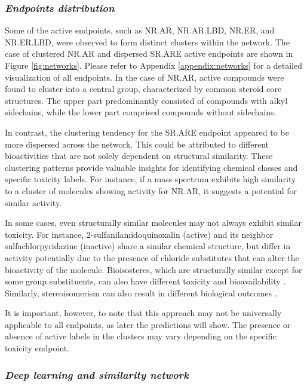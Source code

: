 \subsubsection*{\textit{Endpoints distribution}}

Some of the active endpoints, such as NR.AR, NR.AR.LBD, NR.ER, and NR.ER.LBD, were observed to form distinct clusters within the network. The case of clustered NR.AR and dispersed SR.ARE active endpoints are shown in Figure \ref{fig:networks}. Please refer to Appendix \ref{appendix:networks} for a detailed visualization of all endpoints. In the case of NR.AR, active compounds were found to cluster into a central group, characterized by common steroid core structures. The upper part predominantly consisted of compounds with alkyl sidechains, while the lower part comprised compounds without sidechains.

In contrast, the clustering tendency for the SR.ARE endpoint appeared to be more dispersed across the network. This could be attributed to different bioactivities that are not solely dependent on structural similarity. These clustering patterns provide valuable insights for identifying chemical classes and specific toxicity labels. For instance, if a mass spectrum exhibits high similarity to a cluster of molecules showing activity for NR.AR, it suggests a potential for similar activity.

In some cases, even structurally similar molecules may not always exhibit similar toxicity. For instance, 2-sulfanilamidoquinoxalin (active) and its neighbor sulfachlorpyridazine (inactive) share a similar chemical structure, but differ in activity potentially due to the presence of chloride substitutes that can alter the bioactivity of the molecule. Bioisosteres, which are structurally similar except for some group substituents, can also have different toxicity and bioavailability \cite{Meanwell2014}\cite{Svirev2022}. Similarly, stereoisomerism can also result in different biological outcomes \cite{FABRO1967}.

It is important, however, to note that this approach may not be universally applicable to all endpoints, as later the predictions will show. The presence or absence of active labels in the clusters may vary depending on the specific toxicity endpoint.

\subsubsection*{\textit{Deep learning and similarity network}}

